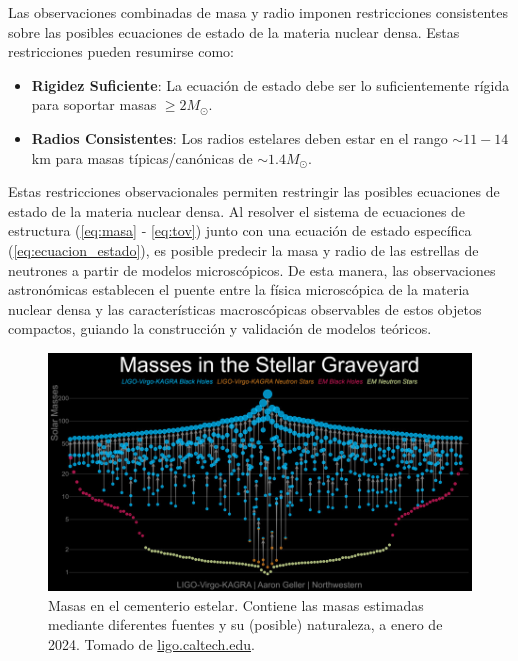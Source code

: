 Las observaciones combinadas de masa y radio imponen restricciones consistentes sobre las posibles ecuaciones de estado de la materia nuclear densa. Estas restricciones pueden resumirse como:

\begin{itemize}
	\item \textbf{Rigidez Suficiente}: La ecuación de estado debe ser lo suficientemente rígida para soportar masas $\geq 2 M_\odot$.
	
	\item \textbf{Radios Consistentes}: Los radios estelares deben estar en el rango $\sim 11-14$ km para masas típicas/canónicas de $\sim 1.4 M_\odot$.
\end{itemize}

Estas restricciones observacionales permiten restringir las posibles ecuaciones de estado de la materia nuclear densa. Al resolver el sistema de ecuaciones de estructura (\ref{eq:masa} - \ref{eq:tov}) junto con una ecuación de estado específica (\ref{eq:ecuacion_estado}), es posible predecir la masa y radio de las estrellas de neutrones a partir de modelos microscópicos. De esta manera, las observaciones astronómicas establecen el puente entre la física microscópica de la materia nuclear densa y las características macroscópicas observables de estos objetos compactos, guiando la construcción y validación de modelos teóricos.

\begin{figure}[h]
	\centering
	\includegraphics[width=0.7\linewidth]{Figuras/ligo-virgo-graveyard}
	\caption{Masas en el cementerio estelar. Contiene las masas estimadas mediante diferentes fuentes y su (posible) naturaleza, a enero de 2024. Tomado de \href{https://www.ligo.caltech.edu/image/ligo20250826d}{ligo.caltech.edu}.}
	\label{fig:ligo-virgo-graveyard}
\end{figure}

